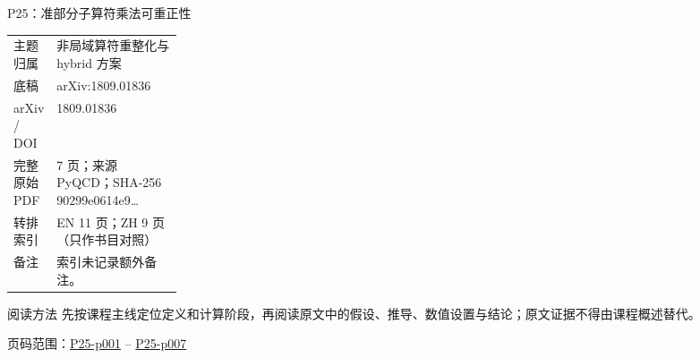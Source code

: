 \documentclass[aspectratio=169,10pt]{ctexbeamer}
\begin{document}
\begin{frame}[t]{P25：准部分子算符乘法可重正性}
\small\begin{tabularx}{\linewidth}{p{0.22\linewidth}Y}
\toprule 主题归属 & 非局域算符重整化与 hybrid 方案\\
底稿 & arXiv:1809.01836\\
arXiv / DOI & 1809.01836\\
完整原始 PDF & 7 页；来源 PyQCD；SHA-256 90299e0614e9\ldots\\
转排索引 & EN 11 页；ZH 9 页（只作书目对照）\\
备注 & 索引未记录额外备注。\\
\bottomrule\end{tabularx}\vspace{0.25cm}
\begin{block}{阅读方法}
先按课程主线定位定义和计算阶段，再阅读原文中的假设、推导、数值设置与结论；原文证据不得由课程概述替代。
\end{block}
\vfill 页码范围：\hyperlink{P25-p001}{P25-p001} -- \hyperlink{P25-p007}{P25-p007}
\end{frame}
\end{document}
